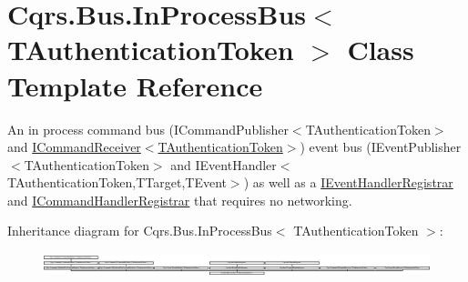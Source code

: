\hypertarget{classCqrs_1_1Bus_1_1InProcessBus}{}\section{Cqrs.\+Bus.\+In\+Process\+Bus$<$ T\+Authentication\+Token $>$ Class Template Reference}
\label{classCqrs_1_1Bus_1_1InProcessBus}


An in process command bus (I\+Command\+Publisher$<$\+T\+Authentication\+Token$>$ and \hyperlink{interfaceCqrs_1_1Commands_1_1ICommandReceiver}{I\+Command\+Receiver$<$\+T\+Authentication\+Token$>$}) event bus (I\+Event\+Publisher$<$\+T\+Authentication\+Token$>$ and I\+Event\+Handler$<$\+T\+Authentication\+Token,\+T\+Target,\+T\+Event$>$) as well as a \hyperlink{interfaceCqrs_1_1Bus_1_1IEventHandlerRegistrar}{I\+Event\+Handler\+Registrar} and \hyperlink{interfaceCqrs_1_1Bus_1_1ICommandHandlerRegistrar}{I\+Command\+Handler\+Registrar} that requires no networking.  


Inheritance diagram for Cqrs.\+Bus.\+In\+Process\+Bus$<$ T\+Authentication\+Token $>$\+:\begin{figure}[H]
\begin{center}
\leavevmode
\includegraphics[height=0.691145cm]{classCqrs_1_1Bus_1_1InProcessBus}
\end{center}
\end{figure}
